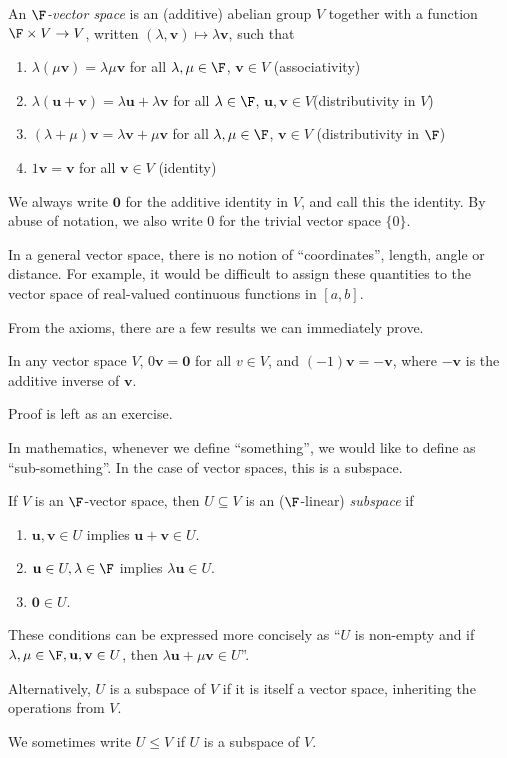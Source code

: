 \documentclass[a4paper]{article}
\begin{document}
\begin{defi}
  An \emph{$\F$-vector space} is an (additive) abelian group $V$ together with a function $\F \times V \to V$, written $(\lambda, \mathbf{v}) \mapsto \lambda \mathbf{v}$, such that
  \begin{enumerate}
    \item $\lambda(\mu \mathbf{v}) = \lambda \mu \mathbf{v}$ for all $\lambda, \mu \in \F$, $\mathbf{v}\in V$ \hfill (associativity)
    \item $\lambda(\mathbf{u} + \mathbf{v}) = \lambda \mathbf{u} + \lambda \mathbf{v}$ for all $\lambda\in \F$, $\mathbf{u}, \mathbf{v}\in V$\hfill (distributivity in $V$)
    \item $(\lambda + \mu) \mathbf{v} = \lambda \mathbf{v} + \mu \mathbf{v}$ for all $\lambda, \mu \in \F$, $\mathbf{v}\in V$ \hfill (distributivity in $\F$)
    \item $1\mathbf{v} = \mathbf{v}$ for all $\mathbf{v}\in V$ \hfill (identity)
  \end{enumerate}

  We always write $\mathbf{0}$ for the additive identity in $V$, and call this the identity. By abuse of notation, we also write $0$ for the trivial vector space $\{0\}$.
\end{defi}
In a general vector space, there is no notion of ``coordinates'', length, angle or distance. For example, it would be difficult to assign these quantities to the vector space of real-valued continuous functions in $[a, b]$.

From the axioms, there are a few results we can immediately prove.
\begin{prop}
  In any vector space $V$, $0\mathbf{v} = \mathbf{0}$ for all $v\in V$, and $(-1)\mathbf{v} = -\mathbf{v}$, where $-\mathbf{v}$ is the additive inverse of $\mathbf{v}$.
\end{prop}
Proof is left as an exercise.

In mathematics, whenever we define ``something'', we would like to define as ``sub-something''. In the case of vector spaces, this is a subspace.
\begin{defi}[Subspace]
  If $V$ is an $\F$-vector space, then $U\subseteq V$ is an ($\F$-linear) \emph{subspace} if
  \begin{enumerate}
    \item $\mathbf{u}, \mathbf{v}\in U$ implies $\mathbf{u} + \mathbf{v} \in U$.
    \item $\mathbf{u}\in U, \lambda \in \F$ implies $\lambda \mathbf{u}\in U$.
    \item $\mathbf{0}\in U$.
  \end{enumerate}
  These conditions can be expressed more concisely as ``$U$ is non-empty and if $\lambda, \mu\in \F, \mathbf{u}, \mathbf{v}\in U$, then $\lambda \mathbf{u} + \mu \mathbf{v}\in U$''.

  Alternatively, $U$ is a subspace of $V$ if it is itself a vector space, inheriting the operations from $V$.

  We sometimes write $U\leq V$ if $U$ is a subspace of $V$.
\end{defi}
\end{document}

